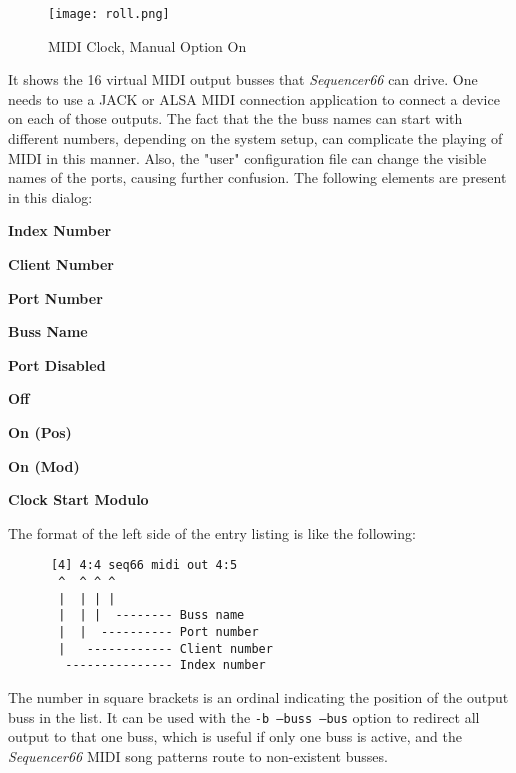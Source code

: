 \begin{figure}[H]
   \centering 
   \texttt{[image: roll.png]}
   \caption{MIDI Clock, Manual Option On}
   \label{fig:seq66_midi_clock_4_devices_manual_1}
\end{figure}

   It shows the 16 virtual MIDI output busses that \textsl{Sequencer66} can
   drive.  One needs to use a JACK or ALSA MIDI
   connection application to connect a device on each of those outputs.  The
   fact that the the buss names can
   start with different numbers, depending on the system setup, can complicate
   the playing of MIDI in this manner.  Also, the "user" configuration file can
   change the visible names of the ports, causing further confusion.
   The following elements are present in this dialog:

   \begin{enumber}
      \item \textbf{Index Number}
      \item \textbf{Client Number}
      \item \textbf{Port Number}
      \item \textbf{Buss Name}
      \item \textbf{Port Disabled}
      \item \textbf{Off}
      \item \textbf{On (Pos)}
      \item \textbf{On (Mod)}
      \item \textbf{Clock Start Modulo}
   \end{enumber}

   The format of the left side of the entry listing is like the following:

   \begin{verbatim}
      [4] 4:4 seq66 midi out 4:5
       ^  ^ ^ ^
       |  | | |
       |  | |  -------- Buss name
       |  |  ---------- Port number
       |   ------------ Client number
        --------------- Index number
   \end{verbatim}

   \setcounter{ItemCounter}{0}      %

   The number in square brackets is an ordinal indicating the position
   of the output buss in the list.
   It can be used with the \texttt{-b --buss --bus} option to redirect all
   output to that one buss, which is useful if only one buss is active, and the
   \textsl{Sequencer66} MIDI song patterns route to non-existent busses.

